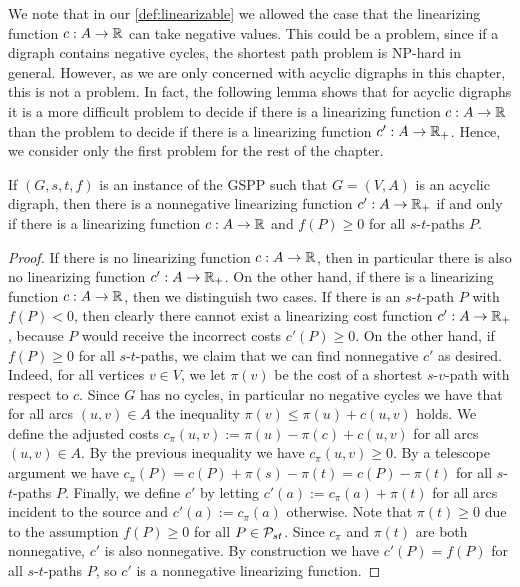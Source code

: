 We note that in our \cref{def:linearizable} we allowed the case that the linearizing function $c : A \to \mathbb{R}$ can take negative values. This could be a problem, since if a digraph contains negative cycles, the shortest path problem is NP-hard in general. However, as we are only concerned with acyclic digraphs in this chapter, this is not a problem. In fact, the following lemma shows that for acyclic digraphs it is a more difficult problem to decide if there is a linearizing function $c : A \to \mathbb{R}$ than the problem to decide if there is a linearizing function $c': A \to \mathbb{R}_+$. Hence, we consider only the first problem for the rest of the chapter.
\begin{lemma}
If $(G,s,t,f)$ is an instance of the GSPP such that $G  = (V,A)$ is an acyclic digraph, then there is a nonnegative linearizing function $c' : A \to \mathbb{R}_+$ if and only if there is a linearizing function $c : A \to \mathbb{R}$ and $f(P) \geq 0$ for all $s$-$t$-paths $P$.
\end{lemma}
\begin{proof}
If there is no linearizing function $c : A \to \mathbb{R}$, then in particular there is also no linearizing function $c' : A \to \mathbb{R}_+$. On the other hand, if there is a linearizing function $c : A \to \mathbb{R}$, then we distinguish two cases. If there is an $s$-$t$-path $P$ with $f(P) < 0$, then clearly there cannot exist a linearizing cost function  $c' : A \to \mathbb{R}_+$, because $P$ would receive the incorrect costs $c'(P) \geq 0$. On the other hand, if $f(P) \geq 0$ for all $s$-$t$-paths, we claim that we can find nonnegative $c'$ as desired. Indeed, for all vertices $v \in V$, we let $\pi(v)$ be the cost of a shortest $s$-$v$-path with respect to $c$. Since $G$ has no cycles, in particular no negative cycles we have that for all arcs $(u,v) \in A$ the inequality $\pi(v) \leq \pi(u) + c(u,v)$ holds. We define the adjusted costs $c_\pi(u,v) := \pi(u) - \pi(c) + c(u,v)$ for all arcs $(u,v) \in A$. By the previous inequality we have $c_\pi(u,v) \geq 0$. By a telescope argument we have $c_\pi(P) = c(P) + \pi(s) - \pi(t) = c(P) - \pi(t)$ for all $s$-$t$-paths $P$. Finally, we define $c'$ by letting $c'(a) := c_\pi (a) + \pi(t)$ for all arcs incident to the source and $c'(a) := c_\pi(a)$ otherwise. Note that $\pi(t) \geq 0$ due to the assumption $f(P) \geq 0$ for all $P \in \mathcal{P}_{st}$. Since $c_\pi$ and $\pi(t)$ are both nonnegative, $c'$ is also nonnegative. By construction we have $c'(P) = f(P)$ for all $s$-$t$-paths $P$, so $c'$ is a nonnegative linearizing function. 
\end{proof}
